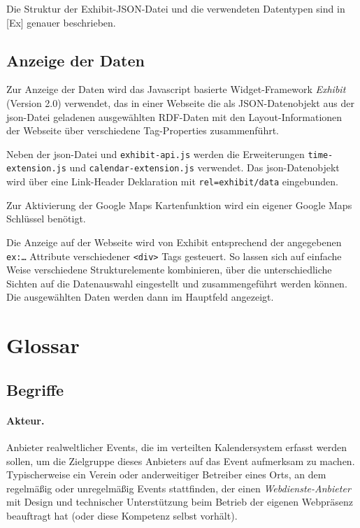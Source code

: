 \documentclass[11pt,a4paper]{article}
\begin{document}
Die Struktur der Exhibit-JSON-Datei und die verwendeten Datentypen sind in
[Ex] genauer beschrieben.

\subsection{Anzeige der Daten}

Zur Anzeige der Daten wird das Javascript basierte Widget-Framework
\emph{Exhibit} (Version 2.0) verwendet, das in einer Webseite die als
JSON-Datenobjekt aus der json-Datei geladenen ausgewählten RDF-Daten mit den
Layout-Informationen der Webseite über verschiedene Tag-Properties
zusammenführt.

Neben der json-Datei und \texttt{exhibit-api.js} werden die Erweiterungen
\texttt{time-extension.js} und \texttt{calendar-extension.js} verwendet.
Das json-Datenobjekt wird über eine Link-Header Deklaration mit
\texttt{rel={\dq}exhibit/data{\dq}} eingebunden. 

Zur Aktivierung der Google Maps Kartenfunktion wird ein eigener Google Maps
Schlüssel benötigt. 

Die Anzeige auf der Webseite wird von Exhibit entsprechend der angegebenen
\texttt{ex:\ldots} Attribute verschiedener \texttt{<div>} Tags gesteuert.  So
lassen sich auf einfache Weise verschiedene Strukturelemente kombinieren, über
die unterschiedliche Sichten auf die Datenauswahl eingestellt und
zusammengeführt werden können.  Die ausgewählten Daten werden dann im
Hauptfeld angezeigt. 


\section{Glossar}

\subsection{Begriffe}

\paragraph{Akteur.} 
Anbieter realweltlicher Events, die im verteilten Kalendersystem erfasst
werden sollen, um die Zielgruppe dieses Anbieters auf das Event aufmerksam zu
machen.  Typischerweise ein Verein oder anderweitiger Betreiber eines Orts, an
dem regelmäßig oder unregelmäßig Events stattfinden, der einen
\emph{Webdienste-Anbieter} mit Design und technischer Unterstüt\-zung beim
Betrieb der eigenen Webpräsenz beauftragt hat (oder diese Kompetenz selbst
vorhält).
\end{document}
